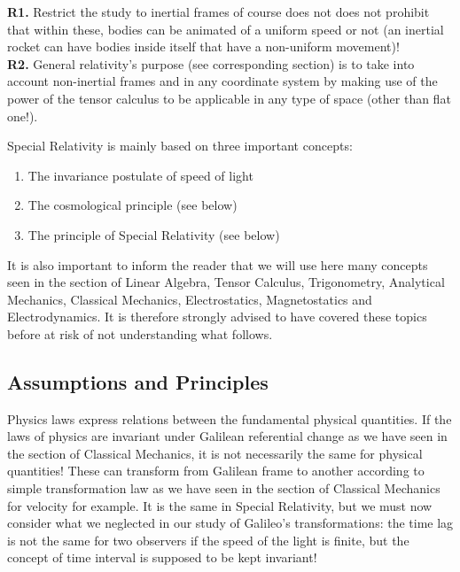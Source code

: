 	\begin{tcolorbox}[title=Remarks,colframe=black,arc=10pt]
	\textbf{R1.} Restrict the study to inertial frames of course does not does not prohibit that within these, bodies can be animated of a uniform speed or not (an inertial rocket can have bodies inside itself that have a non-uniform movement)!\\
	
	\textbf{R2.} General relativity's purpose (see corresponding section) is to take into account non-inertial frames and in any coordinate system by making use of the power of the tensor calculus to be applicable in any type of space (other than flat one!).
	\end{tcolorbox}	
	Special Relativity is mainly based on three important concepts:
	\begin{enumerate}
		\item The invariance postulate of speed of light
		\item The cosmological principle (see below)
		\item The principle of Special Relativity (see below)
	\end{enumerate}
	It is also important to inform the reader that we will use here many concepts seen in the section of Linear Algebra, Tensor Calculus, Trigonometry, Analytical Mechanics, Classical Mechanics, Electrostatics, Magnetostatics and Electrodynamics. It is therefore strongly advised to have covered these topics before at risk of not understanding what follows.
	
	\subsection{Assumptions and Principles}\label{special relativity assumptions and principles}
	Physics laws express relations between the fundamental physical quantities. If the laws of physics are invariant under Galilean referential change as we have seen in the section of Classical Mechanics, it is not necessarily the same for physical quantities! These can transform from Galilean frame to another according to  simple transformation law as we have seen in the section of Classical Mechanics for velocity for example. It is the same in Special Relativity, but we must now consider what we neglected in our study of Galileo's transformations: the time lag is not the same for two observers if the speed of the light is finite, but the concept of time interval is supposed to be kept invariant!
	

